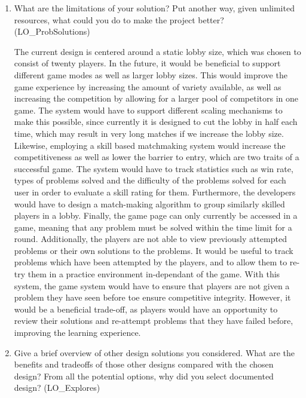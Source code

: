 \documentclass[12pt, titlepage]{article}
\begin{document}
\begin{enumerate}
  \item What are the limitations of your solution?  Put another way, given
  unlimited resources, what could you do to make the project better? (LO\_ProbSolutions)

   The current design is centered around a static lobby size, which was chosen to consist of twenty players. In the future, it would be beneficial to support different game modes as well as larger lobby sizes. This would improve the game experience by increasing the amount of variety available, as well as increasing the competition by allowing for a larger pool of competitors in one game. The system would have to support different scaling mechanisms to make this possible, since currently it is designed to cut the lobby in half each time, which may result in very long matches if we increase the lobby size. Likewise, employing a skill based matchmaking system would increase the competitiveness as well as lower the barrier to entry, which are two traits of a successful game. The system would have to track statistics such as win rate, types of problems solved and the difficulty of the problems solved for each user in order to evaluate a skill rating for them. Furthermore, the developers would have to design a match-making algorithm to group similarly skilled players in a lobby. Finally, the game page can only currently be accessed in a game, meaning that any problem must be solved within the time limit for a round. Additionally, the players are not able to view previously attempted problems or their own solutions to the problems. It would be useful to track problems which have been attempted by the players, and to allow them to re-try them in a practice environment in-dependant of the game. With this system, the game system would have to ensure that players are not given a problem they have seen before toe ensure competitive integrity. However, it would be a beneficial trade-off, as players would have an opportunity to review their solutions and re-attempt problems that they have failed before, improving the learning experience.

  \item Give a brief overview of other design solutions you considered.  What
  are the benefits and tradeoffs of those other designs compared with the chosen
  design?  From all the potential options, why did you select documented design?
  (LO\_Explores)


\end{enumerate}
\end{document}

